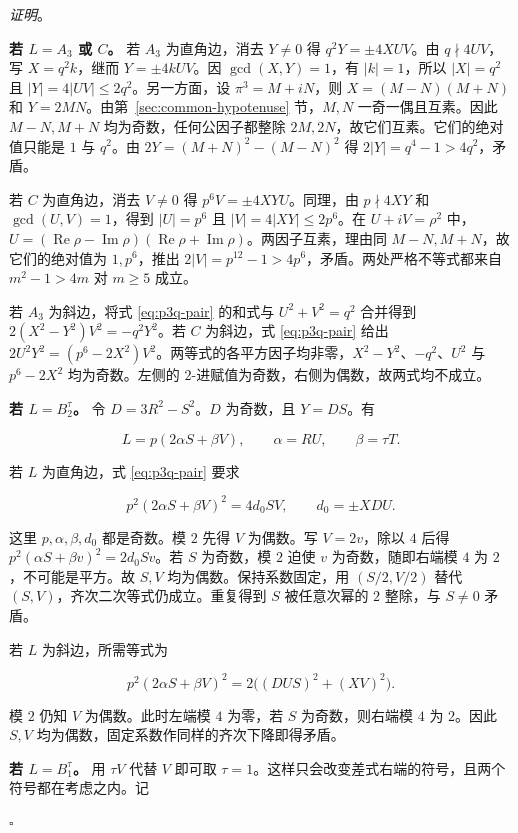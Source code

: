 \documentclass[11pt,a4paper,twoside]{article}
\numberwithin{equation}{section}
\newcommand{\proseheadingstop}{。}
\providecommand{\proofname}{证明}
\newenvironment{proof}[1][\proofname]{%
  \par\addvspace{.65\baselineskip}\noindent
  \textit{#1}\proseheadingstop\enspace\ignorespaces
}{%
  \unskip\nobreak\hfill\nobreak\(\square\)\par
  \addvspace{.65\baselineskip}
}
\begin{document}
\begin{proof}
\textbf{若 \(L=A_3\) 或 \(C\)。} 若 \(A_3\) 为直角边，消去 \(Y\ne0\) 得 \(q^2Y=\pm4XUV\)。由 \(q\nmid4UV\)，写 \(X=q^2 k\)，继而 \(Y=\pm4kUV\)。因 \(\gcd(X,Y)=1\)，有 \(|k|=1\)，所以 \(|X|=q^2\) 且 \(|Y|=4|UV|\le2q^2\)。另一方面，设 \(\pi^3=M+iN\)，则 \(X=(M-N)(M+N)\) 和 \(Y=2MN\)。由第~\ref{sec:common-hypotenuse} 节，\(M,N\) 一奇一偶且互素。因此 \(M-N,M+N\) 均为奇数，任何公因子都整除 \(2M,2N\)，故它们互素。它们的绝对值只能是 \(1\) 与 \(q^2\)。由 \(2Y=(M+N)^2-(M-N)^2\) 得 \(2|Y|=q^4-1>4q^2\)，矛盾。

若 \(C\) 为直角边，消去 \(V\ne0\) 得 \(p^6V=\pm4XYU\)。同理，由 \(p\nmid4XY\) 和 \(\gcd(U,V)=1\)，得到 \(|U|=p^6\) 且 \(|V|=4|XY|\le2p^6\)。在 \(U+iV=\rho^2\) 中，\(U=(\operatorname{Re}\rho-\operatorname{Im}\rho)(\operatorname{Re}\rho+\operatorname{Im}\rho)\)。两因子互素，理由同 \(M-N,M+N\)，故它们的绝对值为 \(1,p^6\)，推出 \(2|V|=p^{12}-1>4p^6\)，矛盾。两处严格不等式都来自 \(m^2-1>4m\) 对 \(m\ge5\) 成立。

若 \(A_3\) 为斜边，将式 \eqref{eq:p3q-pair} 的和式与 \(U^2+V^2=q^2\) 合并得到 \(2(X^2-Y^2)V^2=-q^2Y^2\)。若 \(C\) 为斜边，式 \eqref{eq:p3q-pair} 给出 \(2U^2Y^2=(p^6-2X^2)V^2\)。两等式的各平方因子均非零，\(X^2-Y^2\)、\(-q^2\)、\(U^2\) 与 \(p^6-2X^2\) 均为奇数。左侧的 \(2\)-进赋值为奇数，右侧为偶数，故两式均不成立。

\textbf{若 \(L=B_2^\tau\)。} 令 \(D=3R^2-S^2\)。\(D\) 为奇数，且 \(Y=DS\)。有

\[
L=p(2\alpha S+\beta V),\qquad \alpha=RU,\qquad \beta=\tau T.
\]

若 \(L\) 为直角边，式 \eqref{eq:p3q-pair} 要求

\[
p^2(2\alpha S+\beta V)^2=4d_0SV,\qquad d_0=\pm XDU.
\]

这里 \(p,\alpha,\beta,d_0\) 都是奇数。模 \(2\) 先得 \(V\) 为偶数。写 \(V=2v\)，除以 \(4\) 后得 \(p^2(\alpha S+\beta v)^2=2d_0Sv\)。若 \(S\) 为奇数，模 \(2\) 迫使 \(v\) 为奇数，随即右端模 \(4\) 为 \(2\)，不可能是平方。故 \(S,V\) 均为偶数。保持系数固定，用 \((S/2,V/2)\) 替代 \((S,V)\)，齐次二次等式仍成立。重复得到 \(S\) 被任意次幂的 \(2\) 整除，与 \(S\ne0\) 矛盾。

若 \(L\) 为斜边，所需等式为

\[
p^2(2\alpha S+\beta V)^2=2\bigl((DUS)^2+(XV)^2\bigr).
\]

模 \(2\) 仍知 \(V\) 为偶数。此时左端模 \(4\) 为零，若 \(S\) 为奇数，则右端模 \(4\) 为 \(2\)。因此 \(S,V\) 均为偶数，固定系数作同样的齐次下降即得矛盾。

\textbf{若 \(L=B_1^\tau\)。} 用 \(\tau V\) 代替 \(V\) 即可取 \(\tau=1\)。这样只会改变差式右端的符号，且两个符号都在考虑之内。记


\end{proof}
\end{document}
